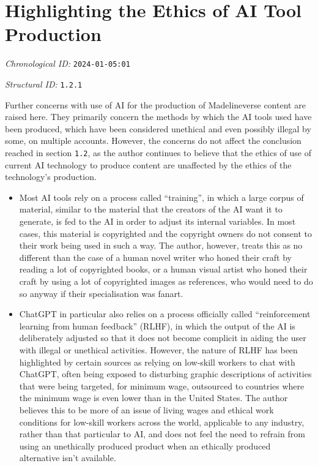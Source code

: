 \section{Highlighting the Ethics of AI Tool Production}
\emph{Chronological ID:} \texttt{2024-01-05:01}

\emph{Structural ID:} \texttt{1.2.1}

Further concerns with use of AI for the production of Madelineverse content are raised here. They primarily concern the methods by which the AI tools used have been produced, which have been considered unethical and even possibly illegal by some, on multiple accounts. However, the concerns do not affect the conclusion reached in section \texttt{1.2}, as the author continues to believe that the ethics of use of current AI technology to produce content are unaffected by the ethics of the technology's production.

\begin{itemize}
  \item Most AI tools rely on a process called ``training'', in which a large corpus of material, similar to the material that the creators of the AI want it to generate, is fed to the AI in order to adjust its internal variables. In most cases, this material is copyrighted and the copyright owners do not consent to their work being used in such a way. The author, however, treats this as no different than the case of a human novel writer who honed their craft by reading a lot of copyrighted books, or a human visual artist who honed their craft by using a lot of copyrighted images as references, who would need to do so anyway if their specialisation was fanart.
  \item ChatGPT in particular also relies on a process officially called ``reinforcement learning from human feedback'' (RLHF), in which the output of the AI is deliberately adjusted so that it does not become complicit in aiding the user with illegal or unethical activities. However, the nature of RLHF has been highlighted by certain sources as relying on low-skill workers to chat with ChatGPT, often being exposed to disturbing graphic descriptions of activities that were being targeted, for minimum wage, outsourced to countries where the minimum wage is even lower than in the United States. The author believes this to be more of an issue of living wages and ethical work conditions for low-skill workers across the world, applicable to any industry, rather than that particular to AI, and does not feel the need to refrain from using an unethically produced product when an ethically produced alternative isn't available.
\end{itemize}
\newpage
